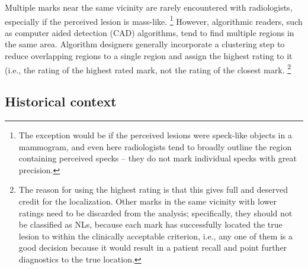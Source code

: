 \documentclass[
]{book}
\begin{document}
Multiple marks near the same vicinity are rarely encountered with radiologists, especially if the perceived lesion is mass-like. \footnote{The exception would be if the perceived lesions were speck-like objects in a mammogram, and even here radiologists tend to broadly outline the region containing perceived specks -- they do not mark individual specks with great precision.} However, algorithmic readers, such as computer aided detection (CAD) algorithms, tend to find multiple regions in the same area. Algorithm designers generally incorporate a clustering step to reduce overlapping regions to a single region and assign the highest rating to it (i.e., the rating of the highest rated mark, not the rating of the closest mark. \footnote{The reason for using the highest rating is that this gives full and deserved credit for the localization. Other marks in the same vicinity with lower ratings need to be discarded from the analysis; specifically, they should not be classified as NLs, because each mark has successfully located the true lesion to within the clinically acceptable criterion, i.e., any one of them is a good decision because it would result in a patient recall and point further diagnostics to the true location.}

\hypertarget{historical-context}{%
\subsection{Historical context}\label{historical-context}}
\end{document}
